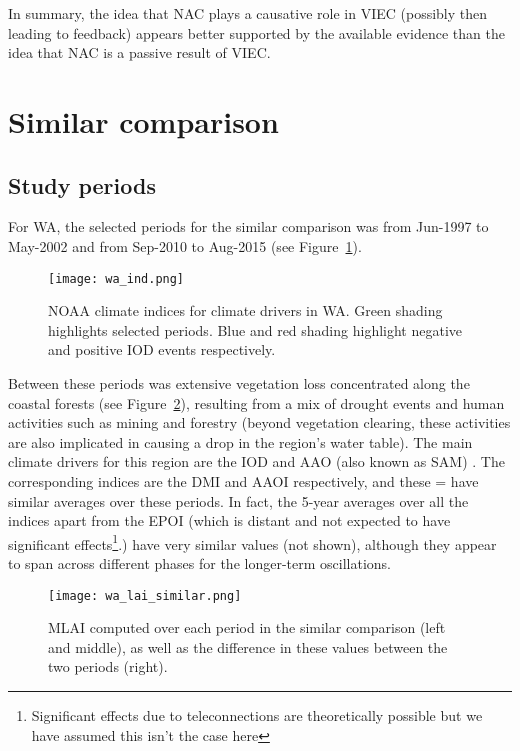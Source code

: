 In summary, the idea that \ac{NAC} plays a causative role in \ac{VIEC} (possibly then leading to feedback) appears better supported by the available evidence than the idea that \ac{NAC} is a passive result of \ac{VIEC}.

\section{Similar comparison}

\subsection{Study periods}

For \ac{WA}, the selected periods for the similar comparison was from Jun-1997 to May-2002 and from Sep-2010 to Aug-2015 (see Figure~\ref{fig:wa_ind}). 

\begin{figure}[!ht]
	\centering
	\texttt{[image: wa\_ind.png]}
	\caption[WA's relevant climate indices for similar comparison]{\ac{NOAA} climate indices for climate drivers in \ac{WA}. Green shading highlights selected periods. Blue and red shading highlight negative and positive \ac{IOD} events respectively.}
	\label{fig:wa_ind}
\end{figure}

Between these periods was extensive vegetation loss concentrated along the coastal forests (see Figure~\ref{fig:wa_lai_similar}), resulting from a mix of drought events and human activities such as mining and forestry (beyond vegetation clearing, these activities are also implicated in causing a drop in the region's water table). The main climate drivers for this region are the \ac{IOD} and \ac{AAO} (also known as \ac{SAM}) \citep{wa_drivers}. The corresponding indices are the \ac{DMI} and \ac{AAOI} respectively, and these = have similar averages over these periods. In fact, the 5-year averages over all the indices apart from the \ac{EPOI} (which is distant and not expected to have significant effects\footnote{Significant effects due to teleconnections are theoretically possible but we have assumed this isn't the case here}.) have very similar values (not shown), although they appear to span across different phases for the longer-term oscillations.

\begin{figure}[!ht]
	\centering
	\texttt{[image: wa\_lai\_similar.png]}
	\caption[MLAI similar comparison for WA focus region]{\ac{MLAI} computed over each period in the similar comparison (left and middle), as well as the difference in these values between the two periods (right).}
	\label{fig:wa_lai_similar}
\end{figure}

